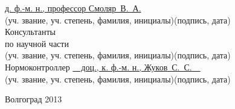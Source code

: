 \begin{titlepage}
\begin{flushleft}
\underline{д. ф.-м. н., профессор Смоляр~В.~А.}\hfill\underline{\hspace{5cm}}\\
\vspace{-.2cm}\hspace{.4cm}\footnotesize(уч. звание, уч. степень, фамилия, инициалы)\hspace{6.5cm}(подпись, дата)\normalsize\\
Консультанты\\
по научной части \underline{\hspace{7cm}}\hfill\underline{\hspace{5cm}}\\
\vspace{-.2cm}\hspace{4cm}\footnotesize(уч. звание, уч. степень, фамилия, инициалы)\hspace{3cm}(подпись, дата)\normalsize\\
Нормоконтроллер \underline{\ \ доц., к. ф.-м. н., Жуков~С.~С.\ \ }\hfill\underline{\hspace{5cm}}\\
\vspace{-.2cm}\hspace{4cm}\footnotesize(уч. звание, уч. степень, фамилия, инициалы)\hspace{3cm}(подпись, дата)\normalsize\\
\end{flushleft}

\vspace{\fill}

\begin{center}
Волгоград 2013
\end{center}

\end{titlepage}
